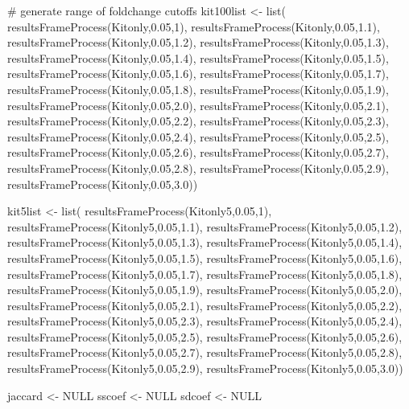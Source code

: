 \documentclass{article}
\begin{document}
# generate range of foldchange cutoffs
kit100list <- list( resultsFrameProcess(Kitonly,0.05,1),
					resultsFrameProcess(Kitonly,0.05,1.1),
					resultsFrameProcess(Kitonly,0.05,1.2),
					resultsFrameProcess(Kitonly,0.05,1.3),
					resultsFrameProcess(Kitonly,0.05,1.4),
					resultsFrameProcess(Kitonly,0.05,1.5),
					resultsFrameProcess(Kitonly,0.05,1.6),
					resultsFrameProcess(Kitonly,0.05,1.7),
					resultsFrameProcess(Kitonly,0.05,1.8),
					resultsFrameProcess(Kitonly,0.05,1.9),
					resultsFrameProcess(Kitonly,0.05,2.0),
					resultsFrameProcess(Kitonly,0.05,2.1),
					resultsFrameProcess(Kitonly,0.05,2.2),
					resultsFrameProcess(Kitonly,0.05,2.3),
					resultsFrameProcess(Kitonly,0.05,2.4),
					resultsFrameProcess(Kitonly,0.05,2.5),
					resultsFrameProcess(Kitonly,0.05,2.6),
					resultsFrameProcess(Kitonly,0.05,2.7),
					resultsFrameProcess(Kitonly,0.05,2.8),
					resultsFrameProcess(Kitonly,0.05,2.9),
					resultsFrameProcess(Kitonly,0.05,3.0))

					
kit5list <- list(   resultsFrameProcess(Kitonly5,0.05,1),
					resultsFrameProcess(Kitonly5,0.05,1.1),
					resultsFrameProcess(Kitonly5,0.05,1.2),
					resultsFrameProcess(Kitonly5,0.05,1.3),
					resultsFrameProcess(Kitonly5,0.05,1.4),
					resultsFrameProcess(Kitonly5,0.05,1.5),
					resultsFrameProcess(Kitonly5,0.05,1.6),
					resultsFrameProcess(Kitonly5,0.05,1.7),
					resultsFrameProcess(Kitonly5,0.05,1.8),
					resultsFrameProcess(Kitonly5,0.05,1.9),
					resultsFrameProcess(Kitonly5,0.05,2.0),
					resultsFrameProcess(Kitonly5,0.05,2.1),
					resultsFrameProcess(Kitonly5,0.05,2.2),
					resultsFrameProcess(Kitonly5,0.05,2.3),
					resultsFrameProcess(Kitonly5,0.05,2.4),
					resultsFrameProcess(Kitonly5,0.05,2.5),
					resultsFrameProcess(Kitonly5,0.05,2.6),
					resultsFrameProcess(Kitonly5,0.05,2.7),
					resultsFrameProcess(Kitonly5,0.05,2.8),
					resultsFrameProcess(Kitonly5,0.05,2.9),
					resultsFrameProcess(Kitonly5,0.05,3.0))

jaccard <- NULL
sscoef <- NULL
sdcoef <- NULL
\end{document}
